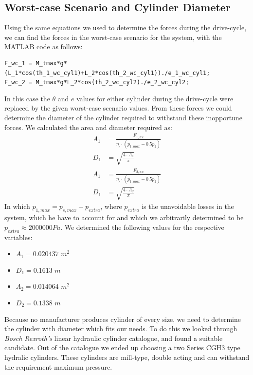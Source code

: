 \documentclass[12pt]{article}
\begin{document}
        \subsection{Worst-case Scenario and Cylinder Diameter}
            Using the same equations we used to determine the forces during the drive-cycle, we can find the forces in the worst-case scenario for the system, with the MATLAB code as follows:
            \begin{lstlisting}
F_wc_1 = M_tmax*g*(L_1*cos(th_1_wc_cyl1)+L_2*cos(th_2_wc_cyl1))./e_1_wc_cyl1;
F_wc_2 = M_tmax*g*L_2*cos(th_2_wc_cyl2)./e_2_wc_cyl2;
            \end{lstlisting}
            In this case the $\theta$ and $e$ values for either cylinder during the drive-cycle were replaced by the given worst-case scenario values.
            From these forces we could determine the diameter of the cylinder required to withstand these inopportune forces.
            We calculated the area and diameter required as:
            \begin{align*}
                A_1 &= \frac{F_{1,wc}}{\eta_c \cdot (p_{1,max}-0.5p_2)}\\
                D_1 &= \sqrt{\frac{4\cdot A_1}{\pi}}\\
                A_1 &= \frac{F_{2,wc}}{\eta_c \cdot (p_{1,max}-0.5p_2)}\\
                D_1 &= \sqrt{\frac{4\cdot A_2}{\pi}}
            \end{align*}
            In which $p_{1,max} = p_{s,max} - p_{extra}$, where $p_{extra}$ is the unavoidable losses in the system, which he have to account for and which we arbitrarily determined to be $p_{extra} \approx 2000000 Pa$.
            We determined the following values for the respective variables:
            \begin{itemize}
                \item $A_1 = 0.020437$ $m^2$
                \item $D_1 = 0.1613$ $m$
                \item $A_2 = 0.014064$ $m^2$
                \item $D_2 = 0.1338$ $m$
            \end{itemize}
            Because no manufacturer produces cylinder of every size, we need to determine the cylinder with diameter which fits our needs.
            To do this we looked through \textit{Bosch Rexroth's} linear hydraulic cylinder catalogue, and found a suitable candidate.
            Out of the catalogue we ended up choosing a two Series CGH3 type hydralic cylinders. These cylinders are mill-type, double acting and can withstand the requirement maximum pressure.
\end{document}
